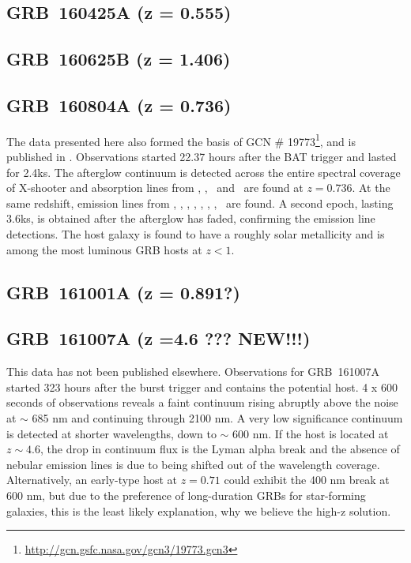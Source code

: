 \documentclass{aa}    %
\begin{document}
\subsection{GRB~160425A (z = 0.555)}	



\subsection{GRB~160625B (z = 1.406)}	



\subsection{GRB~160804A (z = 0.736)}
The data presented here also formed the basis of GCN \#
19773\footnote{\url{http://gcn.gsfc.nasa.gov/gcn3/19773.gcn3}}, and is
published in \citet{Heintz2017b}. Observations started 22.37 hours after the
BAT trigger and lasted for 2.4ks. The afterglow continuum is detected across the entire
spectral coverage of X-shooter and absorption lines from \mgi, \mgii, \feii~and
\alii~are found at $z = 0.736$. At the same redshift, emission lines from \oii,
\oiii, \ha, \hb, \hg, \nii, \sii, \siii~are found. A second epoch, lasting
3.6ks, is obtained after the afterglow has faded, confirming the emission line
detections. The host galaxy is found to have a roughly solar metallicity and is
among the most luminous GRB hosts at $z < 1$.


\subsection{GRB~161001A (z = 0.891?)}	



\subsection{GRB~161007A (z =4.6 ??? NEW!!!)}
This data has not been published elsewhere. Observations for GRB~161007A started
323 hours after the burst trigger and contains the potential host. 4 x 600 seconds
of observations reveals a faint continuum rising abruptly above the noise at
$\sim$ 685 nm and continuing through 2100 nm. A very low significance
continuum is detected at shorter wavelengths, down to $\sim$ 600 nm. If the
host is located at $z \sim 4.6$, the drop in continuum flux is the Lyman alpha
break and the absence of nebular emission lines is due to \oii being shifted
out of the wavelength coverage. Alternatively, an early-type host at $z = 0.71$
could exhibit the 400 nm break at 600 nm, but due to the preference of
long-duration GRBs for star-forming galaxies, this is the least likely
explanation, why we believe the high-z solution.
\end{document}

